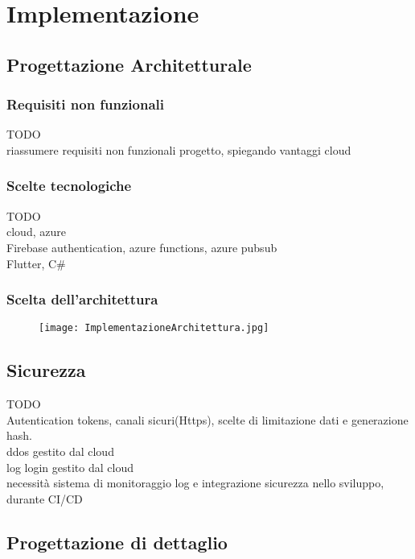 \clearpage
\section{Implementazione}

\subsection{Progettazione Architetturale}

\subsubsection{Requisiti non funzionali}
TODO\\
riassumere requisiti non funzionali progetto, spiegando vantaggi cloud\\
\subsubsection{Scelte tecnologiche}

TODO\\
cloud, azure\\
Firebase authentication, azure functions, azure pubsub\\
Flutter, C\#\\


\subsubsection{Scelta dell'architettura}
\begin{figure}[h!]
    \begin{center}
        \texttt{[image: ImplementazioneArchitettura.jpg]}
    \end{center}
\end{figure}
\subsection{Sicurezza}
TODO\\
Autentication tokens, canali sicuri(Https), scelte di limitazione dati e generazione hash.\\
ddos gestito dal cloud\\
log login gestito dal cloud\\
necessità sistema di monitoraggio log e integrazione sicurezza nello sviluppo, durante CI/CD\\

\newpage
\subsection{Progettazione di dettaglio}


